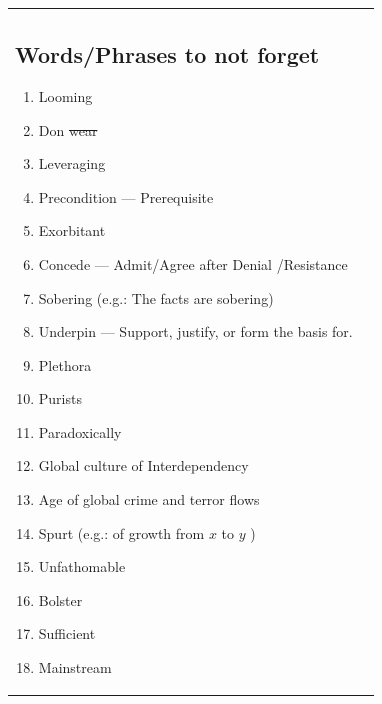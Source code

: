 \documentclass[oneside]{book}
\begin{document}
\begin{tabularx}{\textwidth}{XX}
    \subsection{Words/Phrases to not forget}
    \begin{enumerate}
        \item Looming
        \item Don \st{wear}
        \item Leveraging 
        \item Precondition --- Prerequisite 
        \item Exorbitant
        \item Concede --- Admit/Agree after Denial /Resistance
        \item Sobering (e.g.: The facts are sobering)
        \item Underpin --- Support, justify, or form the basis for.
        \item Plethora
        \item Purists 
        \item Paradoxically
        \item Global culture of Interdependency 
        \item Age of global crime and terror flows
        \item Spurt (e.g.: of growth from \(x\) to \(y\) )
        \item Unfathomable
        \item Bolster 
        \item Sufficient
        \item Mainstream
    \end{enumerate}  & 

\end{tabularx}
\end{document}
